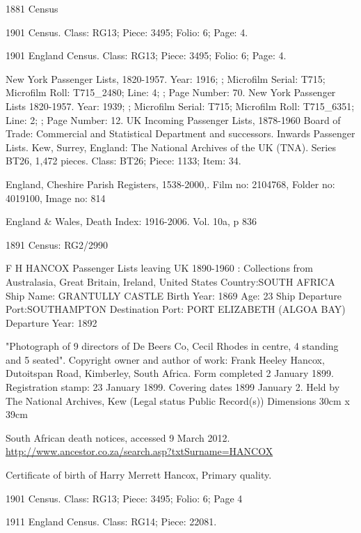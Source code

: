 \begin{thebibliography}{99}
	1881 Census
	
	1901 Census.
	Class: RG13; Piece: 3495; Folio: 6; Page: 4.
	
	1901 England Census.
	Class: RG13; Piece: 3495; Folio: 6; Page: 4.

	New York Passenger Lists, 1820-1957.
	Year: 1916; ; Microfilm Serial: T715; Microfilm Roll: T715\_2480; Line: 4; ; Page Number: 70.
	New York Passenger Lists 1820-1957.
	Year: 1939; ; Microfilm Serial: T715; Microfilm Roll: T715\_6351; Line: 2; ; Page Number: 12.
	UK Incoming Passenger Lists, 1878-1960 Board of Trade: Commercial and Statistical Department and successors.
	Inwards Passenger Lists. Kew, Surrey, England: The National Archives of the UK (TNA).
	Series BT26, 1,472 pieces. Class: BT26; Piece: 1133; Item: 34.

	England, Cheshire Parish Registers, 1538-2000,.
	Film no: 2104768, Folder no: 4019100, Image no: 814
	
	England \& Wales, Death Index: 1916-2006.
	Vol. 10a, p 836
	
	 1891 Census: RG2/2990
	 
	F H HANCOX 
   	Passenger Lists leaving UK 1890-1960 : Collections from Australasia, Great Britain, Ireland, United States
	Country:SOUTH AFRICA
	Ship Name: GRANTULLY CASTLE
	Birth Year: 1869  Age: 23
	Ship Departure Port:SOUTHAMPTON
	Destination Port: PORT ELIZABETH (ALGOA BAY)
	Departure Year: 1892
	
	"Photograph of 9 directors of De Beers Co, Cecil Rhodes in centre, 4 standing and 5 seated".
	Copyright owner and author of work: Frank Heeley Hancox, Dutoitspan Road, Kimberley, South Africa.
	Form completed 2 January 1899. Registration stamp: 23 January 1899.
	Covering dates 1899 January 2. Held by The National Archives, Kew (Legal status Public Record(s))
	Dimensions 30cm x 39cm

	South African death notices, accessed 9 March 2012.
	\url{http://www.ancestor.co.za/search.asp?txtSurname=HANCOX}
	
	Certificate of birth of Harry Merrett Hancox, Primary quality.
	
	1901 Census. Class: RG13; Piece: 3495; Folio: 6; Page 4
	
	1911 England Census. Class: RG14; Piece: 22081.
	

\end{thebibliography}
